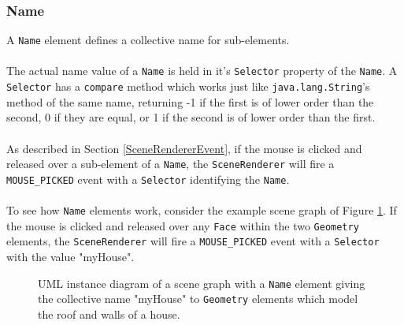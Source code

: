 \documentclass[10pt,aps, prb,preprint]{article}
\begin{document}
\subsubsection{Name}
A \texttt{Name} element defines a collective name for sub-elements.
\\
\\
The actual name value of a \texttt{Name} is held in it's \texttt{Selector} property of the \texttt{Name}. A \texttt{Selector} has a \texttt{compare} method which works just like \texttt{java.lang.String}'s method of the same name,  returning -1 if the first is of lower order than the second, 0 if they are equal, or 1 if the second is of lower order than the first.
\\
\\
As described in Section \ref{SceneRendererEvent}, if the mouse is clicked and released over a sub-element of a \texttt{Name}, the \texttt{SceneRenderer} will fire a \texttt{MOUSE\_PICKED} event with a \texttt{Selector} identifying the \texttt{Name}.
\\
\\
To see how \texttt{Name} elements work, consider the example scene graph of Figure \ref{fig:nameExample}. If the mouse is clicked and released over any \texttt{Face} within the two \texttt{Geometry} elements, the \texttt{SceneRenderer} will fire a \texttt{MOUSE\_PICKED} event with a \texttt{Selector} with the value "myHouse".

\begin{figure}[!h]
\label{fig:nameExample}
\begin{center}
\caption{UML instance diagram of a scene graph with a \texttt{Name} element giving the collective name "myHouse" to \texttt{Geometry} elements which model the roof and walls of a house.}
\end{center}
\end{figure}
\end{document}
